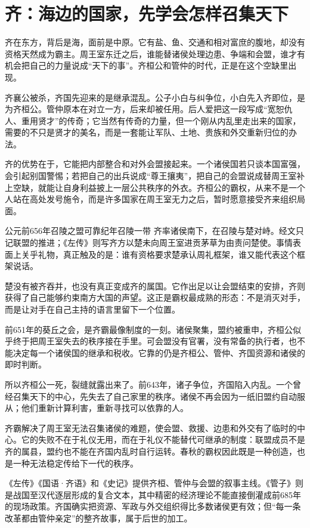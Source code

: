 \section{齐：海边的国家，先学会怎样召集天下}

齐在东方，背后是海，面前是中原。它有盐、鱼、交通和相对富庶的腹地，却没有资格天然成为霸主。周王室东迁之后，谁能替诸侯处理边患、争端和会盟，谁才有机会把自己的力量说成“天下的事”。齐桓公和管仲的时代，正是在这个空缺里出现。


齐襄公被杀，齐国先迎来的是继承混乱。公子小白与纠争位，小白先入齐即位，是为齐桓公。管仲原本在对立一方，后来却被任用。后人爱把这一段写成“宽恕仇人、重用贤才”的传奇；它当然有传奇的力量，但一个刚从内乱里走出来的国家，需要的不只是贤才的美名，而是一套能让军队、土地、贵族和外交重新归位的办法。

齐的优势在于，它能把内部整合和对外会盟接起来。一个诸侯国若只谈本国富强，会引起别国警惕；若把自己的出兵说成“尊王攘夷”，把自己的会盟说成替周王室补上空缺，就能让自身利益披上一层公共秩序的外衣。齐桓公的霸权，从来不是一个人站在高处发号施令，而是许多国家在周王室无力之后，暂时愿意接受齐来组织局面。

\begin{event}{公元前656年}{召陵之盟}{可靠纪年}{召陵一带}
齐率诸侯南下，在召陵与楚对峙。经文只记联盟的推进；《左传》则写齐方以楚未向周王室进贡茅草为由责问楚使。事情表面上关乎礼物，真正触及的是：谁有资格要求楚承认周礼框架，谁又能代表这个框架说话。
\end{event}

楚没有被齐吞并，也没有真正变成齐的属国。它作出足以让会盟结束的安排，齐则获得了自己能够约束南方大国的声望。这正是霸权最成熟的形态：不是消灭对手，而是让对手在自己主持的语言里留下一个位置。


前651年的葵丘之会，是齐霸最像制度的一刻。诸侯聚集，盟约被重申，齐桓公似乎终于把周王室失去的秩序接在手里。可会盟没有官署，没有常备的执行者，也不能决定每一个诸侯国的继承和税收。它靠的仍是齐桓公、管仲、齐国资源和诸侯的即时判断。

所以齐桓公一死，裂缝就露出来了。前643年，诸子争位，齐国陷入内乱。一个曾经召集天下的中心，先失去了自己家里的秩序。诸侯不再会因为一纸旧盟约自动服从；他们重新计算利害，重新寻找可以依靠的人。

\begin{turningpoint}
齐霸解决了周王室无法召集诸侯的难题，使会盟、救援、边患和外交有了临时的中心。它的失败不在于礼仪无用，而在于礼仪不能替代可继承的制度：联盟成员不是齐的属县，盟约也不能在齐国内乱时自行运转。春秋的霸权因此既是一种创造，也是一种无法稳定传给下一代的秩序。
\end{turningpoint}

\begin{sourcenote}[管仲、齐桓与《管子》]
《左传》《国语·齐语》和《史记》提供齐桓、管仲与会盟的叙事主线。《管子》则是战国至汉代逐层形成的复合文本，其中精密的经济理论不能直接倒灌成前685年的现场政策。齐国确实把资源、军政与外交组织得比多数诸侯更有效；但“每一条改革都由管仲亲定”的整齐故事，属于后世的加工。
\end{sourcenote}
